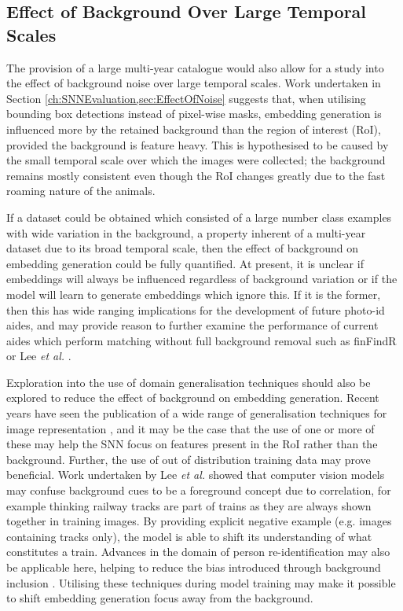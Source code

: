 \subsection{Effect of Background Over Large Temporal Scales}\label{ch:Conclusion,sec:FutureWork,sub:EffectOfBackgroundOnLargeTemporalScales}

The provision of a large multi-year catalogue would also allow for a study into the effect of background noise over large temporal scales. Work undertaken in Section \ref{ch:SNNEvaluation,sec:EffectOfNoise} suggests that, when utilising bounding box detections instead of pixel-wise masks, embedding generation is influenced more by the retained background than the region of interest (RoI), provided the background is feature heavy. This is hypothesised to be caused by the small temporal scale over which the images were collected; the background remains mostly consistent even though the RoI changes greatly due to the fast roaming nature of the animals. 

If a dataset could be obtained which consisted of a large number class examples with wide variation in the background, a property inherent of a multi-year dataset due to its broad temporal scale, then the effect of background on embedding generation could be fully quantified. At present, it is unclear if embeddings will always be influenced regardless of background variation or if the model will learn to generate embeddings which ignore this. If it is the former, then this has wide ranging implications for the development of future photo-id aides, and may provide reason to further examine the performance of current aides which perform matching without full background removal such as finFindR \cite{thompson_finfindr_2022} or Lee \textit{et al.} \cite{lee_backbone_2020}. 

Exploration into the use of domain generalisation techniques should also be explored to reduce the effect of background on embedding generation. Recent years have seen the publication of a wide range of generalisation techniques for image representation \cite{zheng_exploiting_2019, yan_clusterfit_2020, creager_environment_2021, zhou_domain_2022, tommasi_domain_2015, cohn_improving_1994, neyshabur_exploring_2017}, and it may be the case that the use of one or more of these may help the SNN focus on features present in the RoI rather than the background. Further, the use of out of distribution training data may prove beneficial. Work undertaken by Lee \textit{et al.} \cite{lee_weakly_2022} showed that computer vision models may confuse background cues to be a foreground concept due to correlation, for example thinking railway tracks are part of trains as they are always shown together in training images. By providing explicit negative example (e.g. images containing tracks only), the model is able to shift its understanding of what constitutes a train. Advances in the domain of person re-identification may also be applicable here, helping to reduce the bias introduced through background inclusion \cite{nguyen_background_2016, huang_sbsgan_2019, tian_eliminating_2018}. Utilising these techniques during model training may make it possible to shift embedding generation focus away from the background. 

